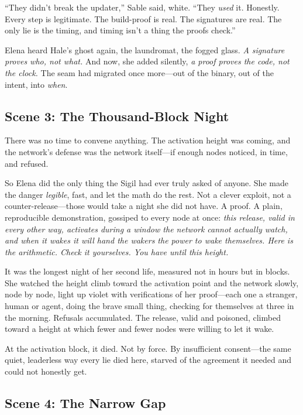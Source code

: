 \documentclass[12pt,letterpaper]{book}
\begin{document}
``They didn't break the updater,'' Sable said, white. ``They \emph{used} it.
Honestly. Every step is legitimate. The build-proof is real. The signatures are
real. The only lie is the timing, and timing isn't a thing the proofs check.''

Elena heard Hale's ghost again, the laundromat, the fogged glass. \emph{A
signature proves who, not what.} And now, she added silently, \emph{a proof proves
the code, not the clock.} The seam had migrated once more---out of the binary, out
of the intent, into \emph{when}.

\hypertarget{scene-3-the-thousand-block-night}{%
\subsection{Scene 3: The Thousand-Block
Night}\label{scene-3-the-thousand-block-night}}

There was no time to convene anything. The activation height was coming, and the
network's defense was the network itself---if enough nodes noticed, in time, and
refused.

So Elena did the only thing the Sigil had ever truly asked of anyone. She made the
danger \emph{legible}, fast, and let the math do the rest. Not a clever exploit, not
a counter-release---those would take a night she did not have. A proof. A plain,
reproducible demonstration, gossiped to every node at once: \emph{this release,
valid in every other way, activates during a window the network cannot actually
watch, and when it wakes it will hand the wakers the power to wake themselves. Here
is the arithmetic. Check it yourselves. You have until this height.}

It was the longest night of her second life, measured not in hours but in blocks.
She watched the height climb toward the activation point and the network slowly,
node by node, light up violet with verifications of her proof---each one a stranger,
human or agent, doing the brave small thing, checking for themselves at three in
the morning. Refusals accumulated. The release, valid and poisoned, climbed toward
a height at which fewer and fewer nodes were willing to let it wake.

At the activation block, it died. Not by force. By insufficient consent---the same
quiet, leaderless way every lie died here, starved of the agreement it needed and
could not honestly get.

\hypertarget{scene-4-the-narrow-gap}{%
\subsection{Scene 4: The Narrow
Gap}\label{scene-4-the-narrow-gap}}
\end{document}
